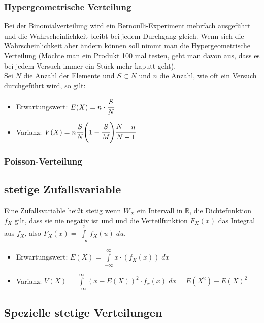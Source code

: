 \documentclass[a4paper]{scrartcl}
\begin{document}
            \subsubsection{Hypergeometrische Verteilung}
                Bei der Binomialverteilung wird ein Bernoulli-Experiment mehrfach ausgeführt und die Wahrscheinlichkeit bleibt bei jedem Durchgang gleich. Wenn sich die Wahrscheinlichkeit
                aber ändern können soll nimmt man die Hypergeometrische Verteilung (Möchte man ein Produkt 100 mal testen, geht man davon aus, dass es bei jedem Versuch immer ein Stück mehr kaputt geht).\\
                Sei \(N\) die Anzahl der Elemente und \(S \subset N\) und \(n\) die Anzahl, wie oft ein Versuch durchgeführt wird, so gilt: 
                \begin{itemize}
                    \item Erwartungswert: \(E(X) = n \cdot \cfrac{S}{N}\)
                    \item Varianz: \(V(X) = n \cfrac{S}{N} \Bigg(1 - \cfrac{S}{M} \Bigg) \cfrac{N - n}{N - 1} \)
                \end{itemize}
            \subsubsection{Poisson-Verteilung}
        \subsection{stetige Zufallsvariable}
            Eine Zufallsvariable heißt stetig wenn \(W_X\) ein Intervall in \(\mathbb{R}\), die Dichtefunktion \(f_X\) gilt, dass sie nie negativ ist und und die Verteilfunktion 
            \(F_X(x)\) das Integral aus \(f_X\), also \(F_X(x) = \int\limits_{-\infty }^x f_X(u) \; du\). 
            \begin{itemize}
                \item Erwartungswert: \(E(X) = \int\limits_{-\infty}^{\infty} x \cdot (f_X(x)) \; dx \)
                \item Varianz: \(V(X) = \int\limits_{-\infty}^{\infty} (x - E(X))^2 \cdot f_x(x) \; dx = E(X^2) - E(X)^2 \)
            \end{itemize}
        \subsection{Spezielle stetige Verteilungen}
\end{document}
